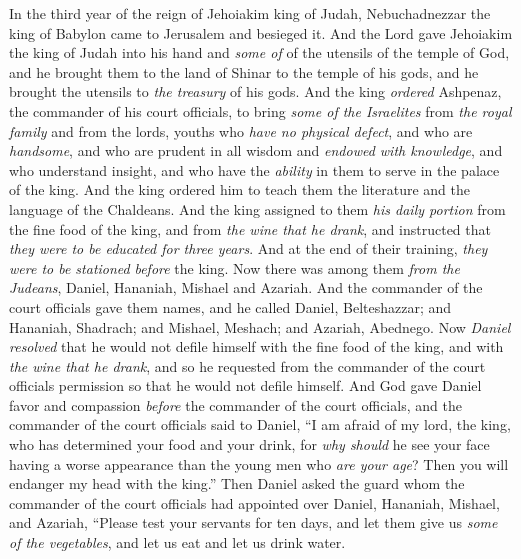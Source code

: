 
\begin{biblechapter} %
 In the third year of the reign of Jehoiakim king of Judah, Nebuchadnezzar the king of Babylon came to Jerusalem and besieged it.
\verse And the Lord gave Jehoiakim the king of Judah into his hand and \textit{some of} of the utensils of the temple of God, and he brought them to the land of Shinar to the temple of his gods, and he brought the utensils to \textit{the treasury} of his gods.
\verse And the king \textit{ordered} Ashpenaz, the commander of his court officials, to bring \textit{some of the Israelites} from \textit{the royal family} and from the lords,
\verse youths who \textit{have no physical defect}, and who are \textit{handsome}, and who are prudent in all wisdom and \textit{endowed with knowledge}, and who understand insight, and who have the \textit{ability} in them to serve in the palace of the king. And the king ordered him to teach them the literature and the language of the Chaldeans.
\verse And the king assigned to them \textit{his daily portion} from the fine food of the king, and from \textit{the wine that he drank}, and instructed that \textit{they were to be educated for three years}. And at the end of their training, \textit{they were to be stationed} \textit{before} the king.
\verse Now there was among them \textit{from the Judeans}, Daniel, Hananiah, Mishael and Azariah.
\verse And the commander of the court officials gave them names, and he called Daniel, Belteshazzar; and Hananiah, Shadrach; and Mishael, Meshach; and Azariah, Abednego.
 Now \textit{Daniel resolved} that he would not defile himself with the fine food of the king, and with \textit{the wine that he drank}, and so he requested from the commander of the court officials permission so that he would not defile himself.
\verse And God gave Daniel favor and compassion \textit{before} the commander of the court officials,
\verse and the commander of the court officials said to Daniel, “I am afraid of my lord, the king, who has determined your food and your drink, for \textit{why should} he see your face having a worse appearance than the young men who \textit{are your age}? Then you will endanger my head with the king.”
\verse Then Daniel asked the guard whom the commander of the court officials had appointed over Daniel, Hananiah, Mishael, and Azariah,
\verse “Please test your servants for ten days, and let them give us \textit{some of the vegetables}, and let us eat and let us drink water.

\end{biblechapter}
